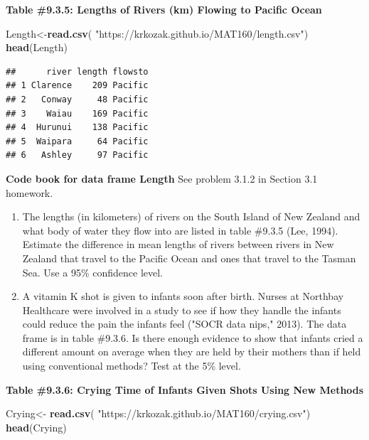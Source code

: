 \documentclass[
]{book}
\newenvironment{Shaded}{\begin{snugshade}}{\end{snugshade}}
\newcommand{\KeywordTok}[1]{\textcolor[rgb]{0.13,0.29,0.53}{\textbf{#1}}}
\newcommand{\NormalTok}[1]{#1}
\newcommand{\StringTok}[1]{\textcolor[rgb]{0.31,0.60,0.02}{#1}}
\begin{document}
\textbf{Table \#9.3.5: Lengths of Rivers (km) Flowing to Pacific Ocean}

\begin{Shaded}
\begin{Highlighting}[]
\NormalTok{Length<-}\KeywordTok{read.csv}\NormalTok{(}
  \StringTok{"https://krkozak.github.io/MAT160/length.csv"}\NormalTok{)}
\KeywordTok{head}\NormalTok{(Length)}
\end{Highlighting}
\end{Shaded}

\begin{verbatim}
##      river length flowsto
## 1 Clarence    209 Pacific
## 2   Conway     48 Pacific
## 3    Waiau    169 Pacific
## 4  Hurunui    138 Pacific
## 5  Waipara     64 Pacific
## 6   Ashley     97 Pacific
\end{verbatim}

\textbf{Code book for data frame Length} See problem 3.1.2 in Section 3.1 homework.

\begin{enumerate}
\def\labelenumi{\arabic{enumi}.}
\setcounter{enumi}{5}
\item
  The lengths (in kilometers) of rivers on the South Island of New Zealand and what body of water they flow into are listed in table \#9.3.5 (Lee, 1994). Estimate the difference in mean lengths of rivers between rivers in New Zealand that travel to the Pacific Ocean and ones that travel to the Tasman Sea. Use a 95\% confidence level.
\item
  A vitamin K shot is given to infants soon after birth. Nurses at Northbay Healthcare were involved in a study to see if how they handle the infants could reduce the pain the infants feel ("SOCR data nips," 2013). The data frame is in table \#9.3.6. Is there enough evidence to show that infants cried a different amount on average when they are held by their mothers than if held using conventional methods? Test at the 5\% level.
\end{enumerate}

\textbf{Table \#9.3.6: Crying Time of Infants Given Shots Using New Methods}

\begin{Shaded}
\begin{Highlighting}[]
\NormalTok{Crying<-}\StringTok{ }\KeywordTok{read.csv}\NormalTok{(}
  \StringTok{"https://krkozak.github.io/MAT160/crying.csv"}\NormalTok{)}
\KeywordTok{head}\NormalTok{(Crying)}
\end{Highlighting}
\end{Shaded}
\end{document}
